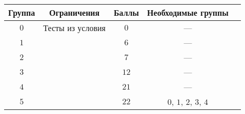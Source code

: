 \begin{center}
\begin{tabular}{|c|c|c|c|c|}
\hline
\textbf{Группа} & \textbf{Ограничения} & \textbf{Баллы} & \textbf{Необходимые группы} \\ \hline
$0$ & Тесты из условия & $0$ & --- \\ \hline
$1$ &  & $6$ & --- \\ \hline
$2$ &  & $7$ & --- \\ \hline
$3$ &  & $12$ & --- \\ \hline
$4$ &  & $21$ & --- \\ \hline
$5$ &  & $22$ & $0$, $1$, $2$, $3$, $4$ \\ \hline
\end{tabular}
\end{center}

